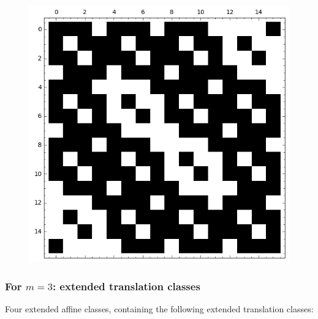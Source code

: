 \documentclass[pdf,sprung,slideColor,nocolorBG]{beamer}
\newenvironment{colortheme}[1]{
\def\ProvidesPackageRCS $##1${\relax}
\renewcommand{\ProcessOptions}{\relax}
\makeatletter

\makeatother
}{}
\begin{document}
\begin{colortheme}{jubata}
\begin{frame}
\begin{figure}
\begin{minipage}{.48\textwidth}
  \label{fig:c4_1_weight_class_matrix}
\end{minipage}%
\begin{minipage}{.48\textwidth}
  \centering
  \includegraphics[width=.9\linewidth]{../matrix_plot/re4_1_bent_cayley_graph_index_matrix.png}
  \label{fig:c4_1_bent_cayley_graph_index_matrix}
\end{minipage}
\end{figure}
\end{frame}
\begin{frame}
\frametitle{For $m=3$: extended translation classes}

Four extended affine classes, containing the following extended translation classes:


\end{frame}
\end{colortheme}
\end{document}
